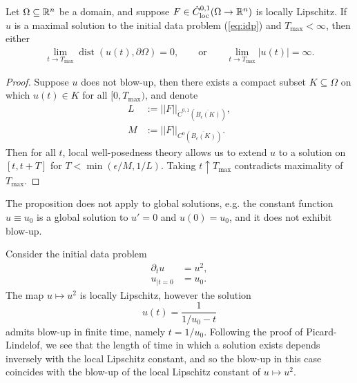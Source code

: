 \begin{corollary}
	Let $\Omega \subseteq \mathbb R^n$ be a domain, and suppose $F \in \dot C^{0, 1}_{\mathrm{loc}} (\Omega \to \mathbb R^n)$ is locally Lipschitz. If $u$ is a maximal solution to the initial data problem (\ref{eq:idp}) and $T_{\text{max}} < \infty$, then either
		\begin{align*}
			\lim_{t \to T_{\text{max}}}\operatorname{dist} (u(t), \partial \Omega) 
				= 0, \qquad \text{or} \qquad
			\lim_{t \to T_{\text{max}}} |u(t)| 
				= \infty.
		\end{align*}
\end{corollary}

\begin{proof}
	Suppose $u$ does not blow-up, then there exists a compact subset $K \subseteq \Omega$ on which $u(t) \in K$ for all $[0, T_{\text{max}})$, and denote
		\begin{align*}
			L
				&:= ||F||_{\dot C^{0, 1} (\overline{B_\epsilon(K)})} ,\\
			M
				&:= ||F||_{C^{0}(\overline{B_\epsilon(K)})}.
		\end{align*}	
	Then for all $t$, local well-posedness theory allows us to extend $u$ to a solution on $[t, t + T]$ for $T < \min (\epsilon/M, 1/L)$. Taking $t \uparrow T_{\text{max}}$ contradicts maximality of $T_{\text{max}}$. 
\end{proof}

\begin{remark}
	The proposition does not apply to global solutions, e.g. the constant function $u \equiv u_0$ is a global solution to $u' = 0$ and $u(0) = u_0$, and it does not exhibit blow-up. 
\end{remark}

\begin{example}
	Consider the initial data problem
	\begin{align*}
		\partial_t u	
			&= u^2, \\
		u_{|t = 0}	
			&= u_0.
	\end{align*}
The map $u \mapsto u^2$ is locally Lipschitz, however the solution
	\[ u(t) = \frac{1}{1/u_0 - t} \]	
admits blow-up in finite time, namely $t = 1/u_0$. Following the proof of Picard-Lindelof, we see that the length of time in which a solution exists depends inversely with the local Lipschitz constant, and so the blow-up in this case coincides with the blow-up of the local Lipschitz constant of $u \mapsto u^2$. 
\end{example}

